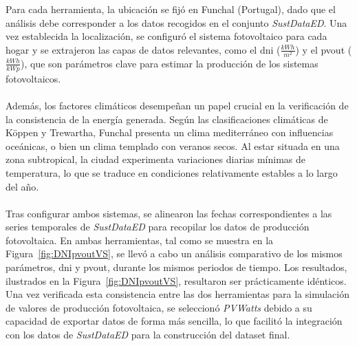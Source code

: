 Para cada herramienta, la ubicación se fijó en Funchal (Portugal), dado que el análisis debe corresponder a los datos recogidos en el conjunto \textit{SustDataED}. Una vez establecida la localización, se configuró el sistema fotovoltaico para cada hogar y se extrajeron las capas de datos relevantes, como el \gls{dni} ($\frac{kWh}{m^{2}}$) y el \gls{pvout} ($\frac{kWh}{kWp}$), que son parámetros clave para estimar la producción de los sistemas fotovoltaicos. \\
\\
Además, los factores climáticos desempeñan un papel crucial en la verificación de la consistencia de la energía generada. Según las clasificaciones climáticas de Köppen y Trewartha, Funchal presenta un clima mediterráneo con influencias oceánicas, o bien un clima templado con veranos secos. Al estar situada en una zona subtropical, la ciudad experimenta variaciones diarias mínimas de temperatura, lo que se traduce en condiciones relativamente estables a lo largo del año.\\
\\
Tras configurar ambos sistemas, se alinearon las fechas correspondientes a las series temporales de \textit{SustDataED} para recopilar los datos de producción fotovoltaica. En ambas herramientas, tal como se muestra en la Figura~\ref{fig:DNIpvoutVS}, se llevó a cabo un análisis comparativo de los mismos parámetros, \gls{dni} y \gls{pvout}, durante los mismos periodos de tiempo. Los resultados, ilustrados en la Figura~\ref{fig:DNIpvoutVS}, resultaron ser prácticamente idénticos. Una vez verificada esta consistencia entre las dos herramientas para la simulación de valores de producción fotovoltaica, se seleccionó \textit{PVWatts} debido a su capacidad de exportar datos de forma más sencilla, lo que facilitó la integración con los datos de \textit{SustDataED} para la construcción del dataset final.

